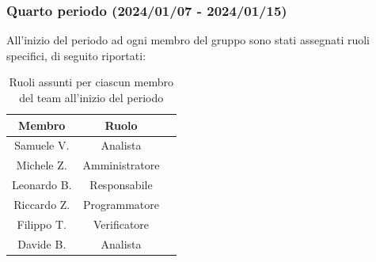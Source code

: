 \subsubsection{Quarto periodo (2024/01/07 - 2024/01/15)}
All'inizio del periodo ad ogni membro del gruppo sono stati assegnati ruoli specifici, di seguito riportati:
\begin{table}[H]
\centering
\begin{tabular}{|c|c|c|}
\hline
\textbf{Membro} & \textbf{Ruolo} \\
\hline
Samuele V. & Analista \\
\hline
Michele Z. & Amministratore \\
\hline
Leonardo B. & Responsabile \\
\hline
Riccardo Z. & Programmatore \\
\hline
Filippo T. & Verificatore \\
\hline
Davide B. & Analista \\
\hline
\end{tabular}
\caption{Ruoli assunti per ciascun membro del team all'inizio del periodo}
\end{table}



